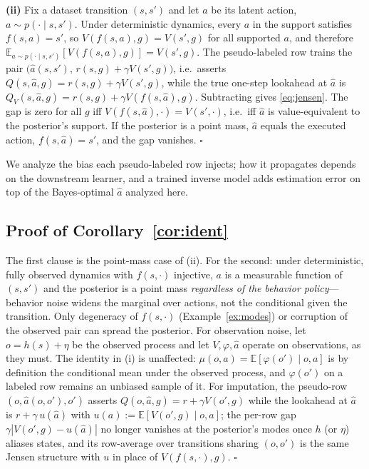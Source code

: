 \documentclass{article}
\newcommand{\E}{\mathbb{E}}
\theoremstyle{plain}
\theoremstyle{definition}
\begin{document}
\textbf{(ii)} Fix a dataset transition $(s,s')$ and let $a$ be its latent action, $a\sim p(\cdot\mid s,s')$. Under deterministic dynamics, every $a$ in the support satisfies $f(s,a)=s'$, so $V(f(s,a),g)=V(s',g)$ for all supported $a$, and therefore
$\E_{a\sim p(\cdot\mid s,s')}[V(f(s,a),g)]=V(s',g)$.
The pseudo-labeled row trains the pair $\big(\hat a(s,s'),\,r(s,g)+\gamma V(s',g)\big)$, i.e.\ asserts $Q(s,\hat a,g)=r(s,g)+\gamma V(s',g)$, while the true one-step lookahead at $\hat a$ is $Q_V(s,\hat a,g)=r(s,g)+\gamma V(f(s,\hat a),g)$. Subtracting gives \eqref{eq:jensen}. The gap is zero for all $g$ iff $V(f(s,\hat a),\cdot)=V(s',\cdot)$, i.e.\ iff $\hat a$ is value-equivalent to the posterior's support. If the posterior is a point mass, $\hat a$ equals the executed action, $f(s,\hat a)=s'$, and the gap vanishes. \hfill$\square$

We analyze the bias each pseudo-labeled row injects; how it propagates depends on the downstream learner, and a trained inverse model adds estimation error on top of the Bayes-optimal $\hat a$ analyzed here.

\subsection{Proof of Corollary~\ref{cor:ident}}
The first clause is the point-mass case of (ii). For the second: under deterministic, fully observed dynamics with $f(s,\cdot)$ injective, $a$ is a measurable function of $(s,s')$ and the posterior is a point mass \emph{regardless of the behavior policy}---behavior noise widens the marginal over actions, not the conditional given the transition. Only degeneracy of $f(s,\cdot)$ (Example~\ref{ex:modes}) or corruption of the observed pair can spread the posterior. For observation noise, let $o=h(s)+\eta$ be the observed process and let $V,\varphi,\hat a$ operate on observations, as they must. The identity in (i) is unaffected: $\mu(o,a)=\E[\varphi(o')\mid o,a]$ is by definition the conditional mean under the observed process, and $\varphi(o')$ on a labeled row remains an unbiased sample of it. For imputation, the pseudo-row $(o,\hat a(o,o'),o')$ asserts $Q(o,\hat a,g)=r+\gamma V(o',g)$ while the lookahead at $\hat a$ is $r+\gamma\,u(\hat a)$ with $u(a):=\E[V(o',g)\mid o,a]$; the per-row gap $\gamma|V(o',g)-u(\hat a)|$ no longer vanishes at the posterior's modes once $h$ (or $\eta$) aliases states, and its row-average over transitions sharing $(o,o')$ is the same Jensen structure with $u$ in place of $V(f(s,\cdot),g)$. \hfill$\square$
\end{document}
